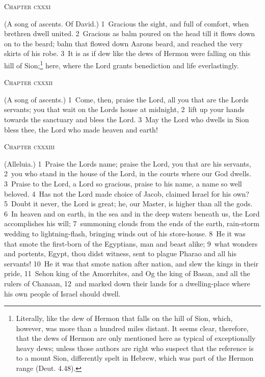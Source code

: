 \documentclass[10pt]{book} %
\begin{document}
\begin{large}\begin{center}\textsc{Chapter cxxxi}\end{center}\end{large}
(A song of ascents. Of David.)
\textcolor{benred8}{1}~Gracious the sight, and full of comfort, when brethren dwell united. \textcolor{benred8}{2}~Gracious as balm poured on the head till it flows down on to the beard; balm that flowed down Aaron\textquotesingle s beard, and reached the very skirts of his robe. \textcolor{benred8}{3}~It is as if dew like the dews of Hermon were falling on this hill of Sion;\footnote[1]{Literally, \textasciigrave like the dew of Hermon that falls on the hill of Sion\textquotesingle , which, however, was more than a hundred miles distant. It seems clear, therefore, that the dews of Hermon are only mentioned here as typical of exceptionally heavy dews; unless those authors are right who suspect that the reference is to a mount Sion, differently spelt in Hebrew, which was part of the Hermon range (Deut. 4.48).} here, where the Lord grants benediction and life everlastingly.
\begin{large}\begin{center}\textsc{Chapter cxxxii}\end{center}\end{large}
(A song of ascents.)
\textcolor{benred8}{1}~Come, then, praise the Lord, all you that are the Lord\textquotesingle s servants; you that wait on the Lord\textquotesingle s house at midnight, \textcolor{benred8}{2}~lift up your hands towards the sanctuary and bless the Lord. \textcolor{benred8}{3}~May the Lord who dwells in Sion bless thee, the Lord who made heaven and earth!
\begin{large}\begin{center}\textsc{Chapter cxxxiii}\end{center}\end{large}
(Alleluia.)
\textcolor{benred8}{1}~Praise the Lord\textquotesingle s name; praise the Lord, you that are his servants, \textcolor{benred8}{2}~you who stand in the house of the Lord, in the courts where our God dwells. \textcolor{benred8}{3}~Praise to the Lord, a Lord so gracious, praise to his name, a name so well beloved. \textcolor{benred8}{4}~Has not the Lord made choice of Jacob, claimed Israel for his own?
\textcolor{benred8}{5}~Doubt it never, the Lord is great; he, our Master, is higher than all the gods. \textcolor{benred8}{6}~In heaven and on earth, in the sea and in the deep waters beneath us, the Lord accomplishes his will; \textcolor{benred8}{7}~summoning clouds from the ends of the earth, rain-storm wedding to lightning-flash, bringing winds out of his store-house. \textcolor{benred8}{8}~He it was that smote the first-born of the Egyptians, man and beast alike; \textcolor{benred8}{9}~what wonders and portents, Egypt, thou didst witness, sent to plague Pharao and all his servants! \textcolor{benred8}{10}~He it was that smote nation after nation, and slew the kings in their pride, \textcolor{benred8}{11}~Sehon king of the Amorrhites, and Og the king of Basan, and all the rulers of Chanaan, \textcolor{benred8}{12}~and marked down their lands for a dwelling-place where his own people of Israel should dwell.
\end{document}
